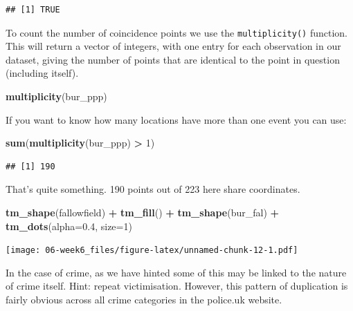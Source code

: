 \documentclass[]{book}
\newenvironment{Shaded}{\begin{snugshade}}{\end{snugshade}}
\newcommand{\DataTypeTok}[1]{\textcolor[rgb]{0.13,0.29,0.53}{#1}}
\newcommand{\DecValTok}[1]{\textcolor[rgb]{0.00,0.00,0.81}{#1}}
\newcommand{\FloatTok}[1]{\textcolor[rgb]{0.00,0.00,0.81}{#1}}
\newcommand{\KeywordTok}[1]{\textcolor[rgb]{0.13,0.29,0.53}{\textbf{#1}}}
\newcommand{\NormalTok}[1]{#1}
\newcommand{\OperatorTok}[1]{\textcolor[rgb]{0.81,0.36,0.00}{\textbf{#1}}}
\newcommand{\StringTok}[1]{\textcolor[rgb]{0.31,0.60,0.02}{#1}}
\begin{document}
\begin{verbatim}
## [1] TRUE
\end{verbatim}

To count the number of coincidence points we use the \texttt{multiplicity()} function. This will return a vector of integers, with one entry for each observation in our dataset, giving the number of points that are identical to the point in question (including itself).

\begin{Shaded}
\begin{Highlighting}[]
\KeywordTok{multiplicity}\NormalTok{(bur_ppp)}
\end{Highlighting}
\end{Shaded}

If you want to know how many locations have more than one event you can use:

\begin{Shaded}
\begin{Highlighting}[]
\KeywordTok{sum}\NormalTok{(}\KeywordTok{multiplicity}\NormalTok{(bur_ppp) }\OperatorTok{>}\StringTok{ }\DecValTok{1}\NormalTok{)}
\end{Highlighting}
\end{Shaded}

\begin{verbatim}
## [1] 190
\end{verbatim}

That's quite something. 190 points out of 223 here share coordinates.

\begin{Shaded}
\begin{Highlighting}[]
\KeywordTok{tm_shape}\NormalTok{(fallowfield) }\OperatorTok{+}\StringTok{ }
\StringTok{  }\KeywordTok{tm_fill}\NormalTok{() }\OperatorTok{+}
\StringTok{  }\KeywordTok{tm_shape}\NormalTok{(bur_fal) }\OperatorTok{+}
\StringTok{  }\KeywordTok{tm_dots}\NormalTok{(}\DataTypeTok{alpha=}\FloatTok{0.4}\NormalTok{, }\DataTypeTok{size=}\DecValTok{1}\NormalTok{)}
\end{Highlighting}
\end{Shaded}

\texttt{[image: 06-week6\_files/figure-latex/unnamed-chunk-12-1.pdf]}

In the case of crime, as we have hinted some of this may be linked to the nature of crime itself. Hint: repeat victimisation. However, this pattern of duplication is fairly obvious across all crime categories in the police.uk website.
\end{document}
